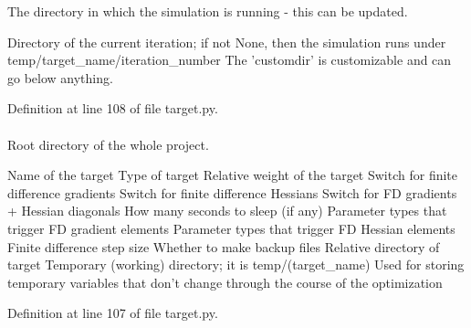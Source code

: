 \-The directory in which the simulation is running -\/ this can be updated. 

\-Directory of the current iteration; if not \-None, then the simulation runs under temp/target\-\_\-name/iteration\-\_\-number \-The 'customdir' is customizable and can go below anything.

\-Definition at line 108 of file target.\-py.

\hypertarget{classforcebalance_1_1target_1_1Target_aede2856573b890cd47054ad36937d6f6}{
\paragraph[{tempdir}]{}}\label{classforcebalance_1_1target_1_1Target_aede2856573b890cd47054ad36937d6f6}


\-Root directory of the whole project. 

\-Name of the target \-Type of target \-Relative weight of the target \-Switch for finite difference gradients \-Switch for finite difference \-Hessians \-Switch for \-F\-D gradients + \-Hessian diagonals \-How many seconds to sleep (if any) \-Parameter types that trigger \-F\-D gradient elements \-Parameter types that trigger \-F\-D \-Hessian elements \-Finite difference step size \-Whether to make backup files \-Relative directory of target \-Temporary (working) directory; it is temp/(target\-\_\-name) \-Used for storing temporary variables that don't change through the course of the optimization 

\-Definition at line 107 of file target.\-py.

\hypertarget{classforcebalance_1_1psi4io_1_1THCDF__Psi4_a8b28a1ea7d85acba8ca9fb5e9d5f2cd1}{
\paragraph[{throw\-\_\-outs}]{}}\label{classforcebalance_1_1psi4io_1_1THCDF__Psi4_a8b28a1ea7d85acba8ca9fb5e9d5f2cd1}



